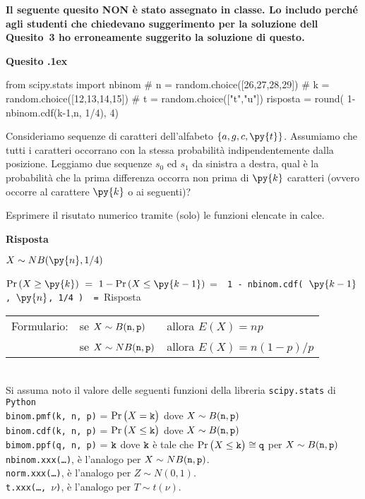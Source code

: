 \documentclass[11pt,twoside,a4paper]{article}
\newcounter{quesito}
\newenvironment{question}{\addtocounter{quesito}{1}\par\textbf{Quesito \thequesito.\kern1ex}}{\vspace{0.5\parskip}}
\newenvironment{answer}{\par\textbf{Risposta\quad}}{\vspace{\parskip}}
\begin{document}
{\color{red}\bfseries Il seguente quesito NON è stato assegnato in classe. Lo includo perché agli studenti che chiedevano suggerimento per la soluzione dell Quesito~3 ho erroneamente suggerito la soluzione di questo.}
   
\begin{question}
\begin{pycode}
from scipy.stats import nbinom
# n = random.choice([26,27,28,29])
# k = random.choice([12,13,14,15])
# t = random.choice(["t","u"])
risposta = round( 1- nbinom.cdf(k-1,n, 1/4), 4)
\end{pycode}
Consideriamo sequenze di caratteri dell'alfabeto $\{a,g,c,\py{t}\}$. 
Assumiamo che tutti i caratteri occorrano con la stessa probabilità indipendentemente dalla posizione.
Leggiamo due sequenze $s_0$ ed $s_1$ da sinistra a destra, qual è la probabilità che la prima differenza occorra non prima di $\py{k}$ caratteri (ovvero occorre al carattere  $\py{k}$ o ai seguenti)?   

Esprimere il risutato numerico tramite (solo) le funzioni elencate in calce.
\begin{answer}
    
  $X\sim NB(\py{n}, 1/4)$
  
  $\Pr(X\ge \py{k})\ =\ 1-\Pr(X\le \py{k-1})$
  \quad =\ 
  {\tt{\color{blue}  1 -  nbinom.cdf( $\py{k-1}$, $\py{n}$, 1/4 )}
  \ =\ 
  \py{risposta}}{\color{blue}\hfill Risposta}
\end{answer}
  \end{question}



\vfill\hrulefill\par
\begin{tabular}{@{}lll}
Formulario:& se $X\sim B({\tt n},{\tt p})$ & allora $E(X)=np$\\
           & se $X\sim NB({\tt n},{\tt p})$& allora $E(X)=n(1-p)/p$\\
\end{tabular}
\\[1ex]
Si assuma noto il valore delle seguenti funzioni della libreria {\tt scipy.stats\/} di  {\tt Python\/}\\
{\tt binom.pmf(k, n, p)} = $\Pr\big(X={\tt k}\big)$ dove $X\sim B({\tt n},{\tt p})$\\
{\tt binom.cdf(k, n, p)} = $\Pr\big(X\le{\tt k}\big)$ dove  $X\sim B({\tt n},{\tt p})$ \\
{\tt bimom.ppf(q, n, p)} = ${\tt k}$ dove ${\tt k}$ è tale che 
                           $\Pr\big(X\le{\tt k}\big)\cong{\tt q}$ per $X\sim B({\tt n},{\tt p})$\\
{\tt nbinom.xxx(\ldots)}, è l'analogo per $X\sim NB({\tt n},{\tt p})$.\\
{\tt norm.xxx(\ldots)}, è l'analogo per $Z\sim N(0,1)$.\\
\hfill{\tt t.xxx(\ldots, $\nu$)}, è l'analogo per $T\sim t(\nu)$.
\end{document}
